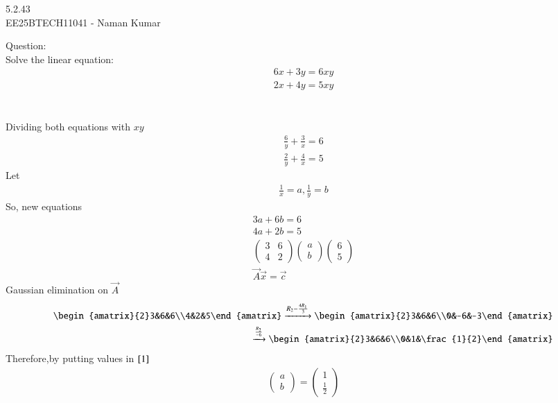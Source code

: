 \documentclass[journal]{IEEEtran}
\author{EE25BTECH11041-Naman Kumar }
\begin{document}
\begin{center}
    \huge{5.2.43}\\
    \large{EE25BTECH11041 - Naman Kumar}
\end{center}
Question:\\
Solve the linear equation:
\begin{align}
    6x + 3y = 6xy\\2x + 4y = 5xy
\end{align} \\
\solution \\
Dividing both equations with $xy$
\begin{align}
    \frac{6}{y}+\frac{3}{x}=6\\
    \frac{2}{y}+\frac{4}{x}=5
\end{align}
Let
\begin{align}
    \frac{1}{x}=a,\frac{1}{y}=b
\end{align}
So, new equations
\begin{align}
    3a+6b=6\\
    4a+2b=5\\
    \begin{pmatrix}3&6\\4&2\end{pmatrix}\begin{pmatrix}a\\b\end{pmatrix}\begin{pmatrix}6\\5\end{pmatrix}\label{1} \\
    \vec{A}\vec{x}=\vec{c}
\end{align}
Gaussian elimination on $\vec{A}$
\begin{align}
    \begin{amatrix}{2}3&6&6\\4&2&5\end{amatrix}\xrightarrow[]{R_2-\frac{4R_1}{3}}\begin{amatrix}{2}3&6&6\\0&-6&-3\end{amatrix}\\
    \xrightarrow[]{\frac{R_2}{-6}}\begin{amatrix}{2}3&6&6\\0&1&\frac{1}{2}\end{amatrix}
\end{align}
Therefore,by putting values in $\eqref{1}$
\begin{align}
    \begin{pmatrix}a\\b\end{pmatrix}=\begin{pmatrix}1 \\ \frac{1}{2}\end{pmatrix}
\end{align}
\end{document}
